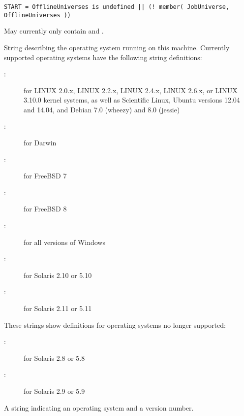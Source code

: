 \begin{description}
\begin{verbatim}
START = OfflineUniverses is undefined || (! member( JobUniverse, OfflineUniverses ))
\end{verbatim}

May currently only contain  and .
%
\label{OpSys-machine-attribute}
\item[\AdAttr{OpSys}:] String describing the operating system running on this
machine.  
Currently supported operating systems have the following string
definitions:
	\begin{description}
	\item[:] for LINUX 2.0.x, LINUX 2.2.x,
	LINUX 2.4.x, LINUX 2.6.x, or LINUX 3.10.0 kernel systems, as well as Scientific Linux, 
        Ubuntu versions 12.04 and 14.04, 
        and Debian 7.0 (wheezy) and 8.0 (jessie)
	\item[:] for Darwin
	\item[:] for FreeBSD 7
	\item[:] for FreeBSD 8
	\item[:] for all versions of Windows
	\item[:] for Solaris 2.10 or 5.10
	\item[:] for Solaris 2.11 or 5.11
	\end{description}
These strings show definitions for operating systems no longer supported:
	\begin{description}
	\item[:] for Solaris 2.8 or 5.8
	\item[:] for Solaris 2.9 or 5.9
	\end{description}
%
\item[\AdAttr{OpSysAndVer}:] A string indicating an operating system and
a version number.


\end{description}
